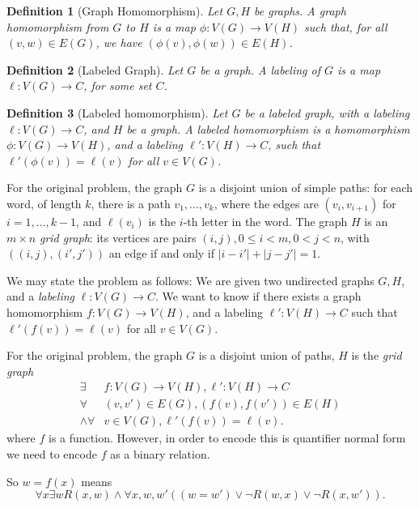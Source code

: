 \documentclass{article}
\newtheorem{definition}{Definition}
\begin{document}
\begin{definition}[Graph Homomorphism]
  Let $G, H$ be graphs.  A \emph{graph homomorphism} from $G$ to $H$
  is a map $\phi : V(G) \rightarrow V(H)$ such that, for all $(v,w) \in
  E(G)$, we have $(\phi(v), \phi(w)) \in E(H)$.
\end{definition}
\begin{definition}[Labeled Graph]
  Let $G$ be a graph.  A \emph{labeling} of $G$ is a map $\ell: V(G)
  \rightarrow C$, for some set $C$.
\end{definition}
\begin{definition}[Labeled homomorphism]
  Let $G$ be a labeled graph, with a \emph{labeling} $\ell: V(G)
  \rightarrow C$, and $H$
  be a graph.  A \emph{labeled homomorphism} is a homomorphism $\phi:
  V(G) \rightarrow V(H)$, and a labeling $\ell': V(H) \rightarrow C$,
  such that $\ell'(\phi(v)) = \ell(v)$ for all $v \in V(G)$.
\end{definition}

For the original problem, the graph $G$ is a disjoint union of simple
paths: for each word, of length $k$, there is a path $v_1, \dots,
v_k$, where the edges are $(v_i, v_{i+1})$ for $i=1, \dots, k-1$, and
$\ell(v_i)$ is the $i$-th letter in the word.  The graph $H$ is an $m
\times n$ \emph{grid graph}: its vertices are pairs $(i,j), 0 \le i <
m, 0 < j < n$, with $((i,j), (i',j'))$ an edge if and only if
$|i-i'| + |j-j'| = 1$.

We may state the problem as follows: We are given two
undirected graphs $G, H$, and a \emph{labeling} $\ell : V(G)
\rightarrow C$.  We want to know if there exists a graph homomorphism
$f: V(G) \rightarrow V(H)$, and a labeling $\ell': V(H) \rightarrow C$
such that $\ell'(f(v)) = \ell(v)$ for all $v \in V(G)$.


For the original problem, the graph $G$ is a disjoint union of paths,
$H$ is the \emph{grid graph}
\begin{equation}
  \label{eq:1}
  \begin{aligned}
    \exists & f: V(G) \rightarrow V(H), \ell': V(H) \rightarrow C \\
    \forall & (v,v') \in E(G), (f(v), f(v')) \in E(H) \\
    \wedge \forall & v \in V(G), \ell'(f(v)) = \ell(v).
  \end{aligned}
\end{equation}
where $f$ is a function.  However, in order to encode this is
quantifier normal form we need to encode $f$ as a binary relation.

So $w=f(x)$ means
\begin{displaymath}
  \forall x \exists w R(x,w) \wedge \forall x,w,w' ((w = w') \vee
  \neg R(w,x) \vee \neg R(x,w')).
\end{displaymath}
\end{document}
